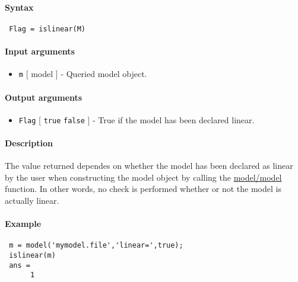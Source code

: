 


	\paragraph{Syntax}
 
 \begin{verbatim}
 Flag = islinear(M)
 \end{verbatim}
 
 \paragraph{Input arguments}
 
 \begin{itemize}
 \item
   \texttt{m} {[} model {]} - Queried model object.
 \end{itemize}
 
 \paragraph{Output arguments}
 
 \begin{itemize}
 \item
   \texttt{Flag} {[} \texttt{true} \textbar{} \texttt{false} {]} - True
   if the model has been declared linear.
 \end{itemize}
 
 \paragraph{Description}
 
 The value returned dependes on whether the model has been declared as
 linear by the user when constructing the model object by calling the
 \url{model/model} function. In other words, no check is performed
 whether or not the model is actually linear.
 
 \paragraph{Example}
 
 \begin{verbatim}
 m = model('mymodel.file','linear=',true);
 islinear(m)
 ans =
      1
 \end{verbatim}


